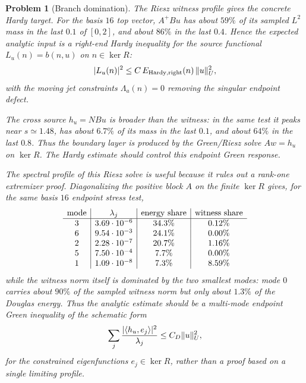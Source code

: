 \documentclass[11pt]{article}
\newtheorem{problem}[theorem]{Problem}
\begin{document}
\begin{problem}[Branch domination]
The Riesz witness profile gives the concrete Hardy target.  For the basis
\(16\) top vector, \(A^+Bu\) has about \(59\%\) of its sampled \(L^2\) mass in
the last \(0.1\) of \([0,2]\), and about \(86\%\) in the last \(0.4\).  Hence
the expected analytic input is a right-end Hardy inequality for the source
functional \(L_u(n)=b(n,u)\) on \(n\in\ker R\):
\[
  |L_u(n)|^2\le C\,E_{\rm Hardy,right}(n)\,\|u\|_U^2,
\]
with the moving jet constraints \(\Lambda_a(n)=0\) removing the singular
endpoint defect.

The cross source \(h_u=NBu\) is broader than the witness: in the same test it
peaks near \(s\simeq1.48\), has about \(6.7\%\) of its mass in the last \(0.1\),
and about \(64\%\) in the last \(0.8\).  Thus the boundary layer is produced by
the Green/Riesz solve \(Aw=h_u\) on \(\ker R\).  The Hardy estimate should
control this endpoint Green response.

The spectral profile of this Riesz solve is useful because it rules out a
rank-one extremizer proof.  Diagonalizing the positive block \(A\) on the
finite \(\ker R\) gives, for the same basis \(16\) endpoint stress test,
\[
\begin{array}{c|c|c|c}
{\rm mode} & \lambda_j & {\rm energy\ share} & {\rm witness\ share}\\
\hline
3 & 3.69\cdot10^{-6} & 34.3\% & 0.12\%\\
6 & 9.54\cdot10^{-3} & 24.1\% & 0.00\%\\
2 & 2.28\cdot10^{-7} & 20.7\% & 1.16\%\\
5 & 7.50\cdot10^{-4} &  7.7\% & 0.00\%\\
1 & 1.09\cdot10^{-8} &  7.3\% & 8.59\%
\end{array}
\]
while the witness norm itself is dominated by the two smallest modes:
mode \(0\) carries about \(90\%\) of the sampled witness norm but only about
\(1.3\%\) of the Douglas energy.  Thus the analytic estimate should be a
multi-mode endpoint Green inequality of the schematic form
\[
  \sum_j {|\langle h_u,e_j\rangle|^2\over \lambda_j}
  \le C_D \|u\|_U^2,
\]
for the constrained eigenfunctions \(e_j\in\ker R\), rather than a proof based
on a single limiting profile.


\end{problem}
\end{document}
